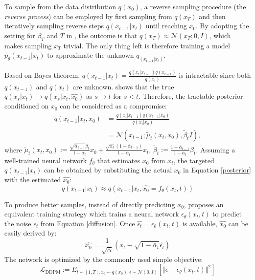 \documentclass{article} \usepackage{iclr2024_conference,times}
\begin{document}
To sample from the data distribution \(q(x_0)\), a reverse sampling procedure (the \emph{reverse process}) can be employed by first sampling from \(q(x_T)\) and then iteratively sampling reverse steps \(q(x_{t-1}|x_t)\) until reaching \(x_0\). By adopting the setting for \(\beta_{T}\) and $T$ in \citet{DBLP:conf/nips/HoJA20}, the outcome is that $q(x_{T}) \approx \mathcal N(x_{T}; 0, I)$, which makes sampling $x_{T}$ trivial. The only thing left is therefore training a model $p_{\theta}(x_{t-1}|x_t)$ to approximate the unknown $q_(x_{t-1}|x_t)$. 

Based on Bayes theorem, $q(x_{t-1}|x_{t})=\frac{q(x_{t}|x_{t-1})q(x_{t-1})} {q(x_t)}$ is intractable since both $q(x_{t-1})$ and $q(x_t)$ are unknown. \citet{DBLP:conf/iclr/0011SKKEP21} shows that the true $q(x_s|x_t) \rightarrow q(x_s|x_t, \hat{x_0})$ as $s \rightarrow t$ for $s<t$. Therefore, the tractable posterior conditioned on $x_0$ can be considered as a compromise:
\begin{equation}
    \begin{split}
        q(x_{t-1}|x_{t}, x_0) &= \frac{q(x_{t}|x_{t-1})q(x_{t-1}|x_0)} {q(x_t|x_0)}\\
        &= \mathcal N(x_{t-1}; \widetilde{\mu}_t(x_t, x_0), \widetilde{\beta}_tI),\label{posterior}
    \end{split}
\end{equation}
where $\widetilde{\mu}_t(x_t, x_0):=\frac{\sqrt{\bar{\alpha}_{t-1}}\beta_t}{1-\bar{\alpha}_{t}}x_0+\frac{\sqrt{\alpha_t}(1-\bar{\alpha}_{t-1})}{1-\bar{\alpha}_{t}}x_t$, $\widetilde{\beta}_t:=\frac{1-\bar{\alpha}_{t-1}}{1-\bar{\alpha}_{t}}\beta_t$. Assuming a well-trained neural network \(f_\theta\) that estimates \(x_0\) from \(x_t\), the targeted \(q(x_{t-1}|x_{t})\) can be obtained by substituting the actual \(x_0\) in Equation \ref{posterior} with the estimated \(\hat{x_0}\):
\begin{equation}
    q(x_{t-1}|x_{t}) \approx q(x_{t-1}|x_{t}, \hat{x_0}=f_{\theta}(x_t, t)) \nonumber
\end{equation}

To produce better samples, instead of directly predicting $x_0$, \citet{DBLP:conf/nips/HoJA20} proposes an equivalent training strategy which trains a neural network $\epsilon_\theta(x_t, t)$ to predict the noise $\epsilon_t$ from Equation \ref{diffusion}. Once $\hat{\epsilon_t} = \epsilon_\theta(x_t, t)$ is available, $\hat{x_0}$ can be easily derived by:
\begin{equation}
   \hat{x_0} = \frac{1}{\sqrt{\bar{\alpha}}}(x_t - \sqrt{1-\bar{\alpha}_{t}}\hat{\epsilon_t}) \nonumber
\end{equation}
The network is optimized by the commonly used simple objective:
\begin{equation}
   \mathcal{L}_{\textrm{DDPM}} := E_{t \sim [1, T], x_0 \sim q(x_0), \epsilon \sim \mathcal{N}(0, I)}[\Vert \epsilon - \epsilon_\theta(x_t, t)\Vert^{2}] \label{ddpm_loss}
\end{equation}
\end{document}
